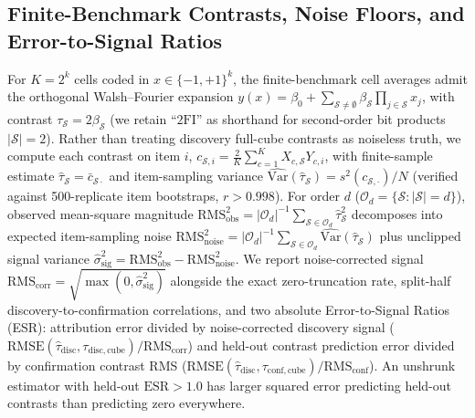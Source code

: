 \documentclass[11pt,a4paper]{article}
\begin{document}
\subsection{Finite-Benchmark Contrasts, Noise Floors, and Error-to-Signal Ratios}
For $K = 2^k$ cells coded in $x \in \{-1, +1\}^k$, the finite-benchmark cell averages admit the orthogonal Walsh--Fourier expansion $y(x) = \beta_0 + \sum_{\mathcal{S} \neq \emptyset} \beta_{\mathcal{S}} \prod_{j \in \mathcal{S}} x_j$, with contrast $\tau_{\mathcal{S}} = 2\beta_{\mathcal{S}}$ (we retain ``$2\mathrm{FI}$'' as shorthand for second-order bit products $|\mathcal{S}|=2$). Rather than treating discovery full-cube contrasts as noiseless truth, we compute each contrast on item $i$, $c_{\mathcal{S},i} = \frac{2}{K}\sum_{c=1}^K X_{c,\mathcal{S}} Y_{c,i}$, with finite-sample estimate $\hat{\tau}_{\mathcal{S}} = \bar{c}_{\mathcal{S}\cdot}$ and item-sampling variance $\widehat{\mathrm{Var}}(\hat{\tau}_{\mathcal{S}}) = s^2(c_{\mathcal{S},\cdot})/N$ (verified against 500-replicate item bootstraps, $r > 0.998$). For order $d$ ($\mathcal{O}_d = \{\mathcal{S}: |\mathcal{S}|=d\}$), observed mean-square magnitude $\mathrm{RMS}_{\mathrm{obs}}^2 = |\mathcal{O}_d|^{-1}\sum_{\mathcal{S}\in\mathcal{O}_d} \hat{\tau}_{\mathcal{S}}^2$ decomposes into expected item-sampling noise $\mathrm{RMS}_{\mathrm{noise}}^2 = |\mathcal{O}_d|^{-1}\sum_{\mathcal{S}\in\mathcal{O}_d}\widehat{\mathrm{Var}}(\hat{\tau}_{\mathcal{S}})$ plus unclipped signal variance $\hat{\sigma}_{\mathrm{sig}}^2 = \mathrm{RMS}_{\mathrm{obs}}^2 - \mathrm{RMS}_{\mathrm{noise}}^2$. We report noise-corrected signal $\mathrm{RMS}_{\mathrm{corr}} = \sqrt{\max(0, \hat{\sigma}_{\mathrm{sig}}^2)}$ alongside the exact zero-truncation rate, split-half discovery-to-confirmation correlations, and two absolute Error-to-Signal Ratios (ESR): attribution error divided by noise-corrected discovery signal ($\mathrm{RMSE}(\hat{\tau}_{\mathrm{disc}}, \tau_{\mathrm{disc,cube}}) / \mathrm{RMS}_{\mathrm{corr}}$) and held-out contrast prediction error divided by confirmation contrast RMS ($\mathrm{RMSE}(\hat{\tau}_{\mathrm{disc}}, \tau_{\mathrm{conf,cube}}) / \mathrm{RMS}_{\mathrm{conf}}$). An unshrunk estimator with held-out $\mathrm{ESR} > 1.0$ has larger squared error predicting held-out contrasts than predicting zero everywhere.
\end{document}

